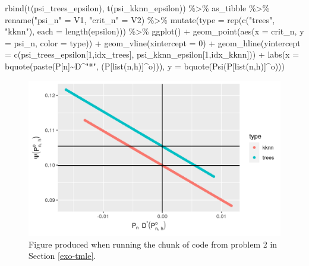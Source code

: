 \documentclass[
  11pt,
  openright,twoside]{book}
\newenvironment{Shaded}{\begin{snugshade}}{\end{snugshade}}
\newcommand{\AttributeTok}[1]{\textcolor[rgb]{0.77,0.63,0.00}{#1}}
\newcommand{\DecValTok}[1]{\textcolor[rgb]{0.00,0.00,0.81}{#1}}
\newcommand{\FunctionTok}[1]{\textcolor[rgb]{0.00,0.00,0.00}{#1}}
\newcommand{\NormalTok}[1]{#1}
\newcommand{\OtherTok}[1]{\textcolor[rgb]{0.56,0.35,0.01}{#1}}
\newcommand{\SpecialCharTok}[1]{\textcolor[rgb]{0.00,0.00,0.00}{#1}}
\newcommand{\StringTok}[1]{\textcolor[rgb]{0.31,0.60,0.02}{#1}}
\theoremstyle{definition}
\theoremstyle{definition}
\theoremstyle{definition}
\theoremstyle{definition}
\theoremstyle{remark}
\begin{document}
\begin{Shaded}
\begin{Highlighting}[]
\FunctionTok{rbind}\NormalTok{(}\FunctionTok{t}\NormalTok{(psi\_trees\_epsilon), }\FunctionTok{t}\NormalTok{(psi\_kknn\_epsilon)) }\SpecialCharTok{\%\textgreater{}\%}\NormalTok{ as\_tibble }\SpecialCharTok{\%\textgreater{}\%}
  \FunctionTok{rename}\NormalTok{(}\StringTok{"psi\_n"} \OtherTok{=}\NormalTok{ V1, }\StringTok{"crit\_n"} \OtherTok{=}\NormalTok{ V2) }\SpecialCharTok{\%\textgreater{}\%}
  \FunctionTok{mutate}\NormalTok{(}\AttributeTok{type =} \FunctionTok{rep}\NormalTok{(}\FunctionTok{c}\NormalTok{(}\StringTok{"trees"}\NormalTok{, }\StringTok{"kknn"}\NormalTok{), }\AttributeTok{each =} \FunctionTok{length}\NormalTok{(epsilon))) }\SpecialCharTok{\%\textgreater{}\%} 
  \FunctionTok{ggplot}\NormalTok{() }\SpecialCharTok{+}
  \FunctionTok{geom\_point}\NormalTok{(}\FunctionTok{aes}\NormalTok{(}\AttributeTok{x =}\NormalTok{ crit\_n, }\AttributeTok{y =}\NormalTok{ psi\_n, }\AttributeTok{color =}\NormalTok{ type)) }\SpecialCharTok{+}
  \FunctionTok{geom\_vline}\NormalTok{(}\AttributeTok{xintercept =} \DecValTok{0}\NormalTok{) }\SpecialCharTok{+}
  \FunctionTok{geom\_hline}\NormalTok{(}\AttributeTok{yintercept =} \FunctionTok{c}\NormalTok{(psi\_trees\_epsilon[}\DecValTok{1}\NormalTok{,idx\_trees],}
\NormalTok{                            psi\_kknn\_epsilon[}\DecValTok{1}\NormalTok{,idx\_kknn])) }\SpecialCharTok{+}
  \FunctionTok{labs}\NormalTok{(}\AttributeTok{x =} \FunctionTok{bquote}\NormalTok{(}\FunctionTok{paste}\NormalTok{(P[n]}\SpecialCharTok{\textasciitilde{}}\NormalTok{D}\SpecialCharTok{\^{}}\StringTok{"*"}\NormalTok{, (P[}\FunctionTok{list}\NormalTok{(n,h)]}\SpecialCharTok{\^{}}\NormalTok{o))),}
       \AttributeTok{y =} \FunctionTok{bquote}\NormalTok{(}\FunctionTok{Psi}\NormalTok{(P[}\FunctionTok{list}\NormalTok{(n,h)]}\SpecialCharTok{\^{}}\NormalTok{o)))}
\end{Highlighting}
\end{Shaded}

\begin{figure}

{\centering \includegraphics[width=0.7\linewidth]{img/exo-tmle-1} 

}

\caption{Figure produced when running the chunk of code from problem 2 in Section \ref{exo-tmle}.}\label{fig:exo-tmle}
\end{figure}
\end{document}
